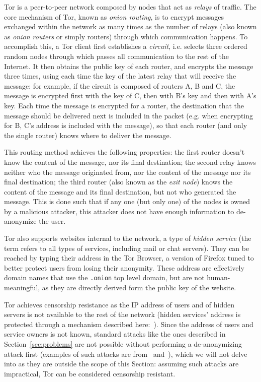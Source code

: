 \documentclass[mscthesis]{usiinfthesis}
\begin{document}
Tor is a peer-to-peer network composed by nodes that act as \emph{relays} of traffic. The core mechanism of Tor, known as \emph{onion routing}, is to encrypt messages exchanged within the network as many times as the number of relays (also known as \emph{onion routers} or simply routers) through which communication happens. To accomplish this, a Tor client first establishes a \emph{circuit}, i.e. selects three ordered random nodes through which passes all communication to the rest of the Internet. It then obtains the public key of each router, and encrypts the message three times, using each time the key of the latest relay that will receive the message: for example, if the circuit is composed of routers A, B and C, the message is encrypted first with the key of C, then with B's key and then with A's key. Each time the message is encrypted for a router, the destination that the message should be delivered next is included in the packet (e.g. when encrypting for B, C's address is included with the message), so that each router (and only the single router) knows where to deliver the message.

This routing method achieves the following properties: the first router doesn't know the content of the message, nor its final destination; the second relay knows neither who the message originated from, nor the content of the message nor its final destination; the third router (also known as the \emph{exit node}) knows the content of the message and its final destination, but not who generated the message. This is done such that if any one (but only one) of the nodes is owned by a malicious attacker, this attacker does not have enough information to de-anonymize the user.

Tor also supports websites internal to the network, a type of \emph{hidden service} (the term refers to all types of services, including mail or chat servers). They can be reached by typing their address in the Tor Browser, a version of Firefox tuned to better protect users from losing their anonymity. These address are effectively domain names that use the \texttt{.onion} top level domain, but are not human-meaningful, as they are directly derived form the public key of the website.

Tor achieves censorship resistance as the IP address of users and of hidden servers is not available to the rest of the network (hidden services' address is protected through a mechanism described here:~\cite{website:torhiddenservice}). Since the address of users and service owners is not known, standard attacks like the ones described in Section~\ref{sec:problems} are not possible without performing a de-anonymizing attack first (examples of such attacks are from~\cite{jansen2014sniper} and~\cite{kwon2015circuit}), which we will not delve into as they are outside the scope of this Section: assuming such attacks are impractical, Tor can be considered censorship resistant.
\end{document}
